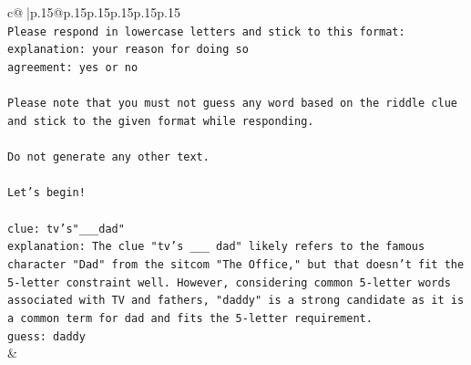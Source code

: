 \documentclass{article}
\begin{document}
{\begin{supertabular}{c@{$\;$}|p{.15\linewidth}@{}p{.15\linewidth}p{.15\linewidth}p{.15\linewidth}p{.15\linewidth}p{.15\linewidth}}
{{{\\ 
\texttt{Please respond in lowercase letters and stick to this format:} \\
\texttt{explanation: your reason for doing so} \\
\texttt{agreement: yes or no} \\
\\ 
\texttt{Please note that you must not guess any word based on the riddle clue and stick to the given format while responding.} \\
\\ 
\texttt{Do not generate any other text.} \\
\\ 
\texttt{Let's begin!} \\
\\ 
\texttt{clue: tv's"\_\_\_dad"} \\
\texttt{explanation: The clue "tv's \_\_\_ dad" likely refers to the famous character "Dad" from the sitcom "The Office," but that doesn't fit the 5{-}letter constraint well. However, considering common 5{-}letter words associated with TV and fathers, "daddy" is a strong candidate as it is a common term for dad and fits the 5{-}letter requirement.} \\
\texttt{guess: daddy} \\
            }
        }
    }
    & \\ \\


\end{supertabular}}
\end{document}
